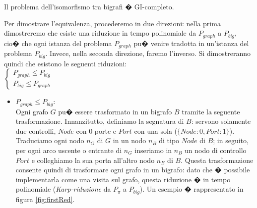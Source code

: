 \begin{teor}
Il problema dell'isomorfismo tra bigrafi � GI-completo.
\end{teor}

\begin{dimos}
Per dimostrare l'equivalenza, procederemo in due direzioni: nella prima dimostreremo che esiste una riduzione in tempo polinomiale da $P_{graph}$ a $P_{big}$, cio� che ogni istanza del problema $P_{graph}$ pu� venire tradotta in un'istanza del problema $P_{big}$. Invece, nella seconda direzione, faremo l'inverso. Si dimostreranno quindi che esistono le seguenti riduzioni:\\

$
\begin{cases}   
P_{graph} \le P_{big}\\
P_{big} \le P_{graph}
\end{cases}
$
\\


\begin{itemize}
	\item
	$P_{graph} \le P_{big}$:\\
	Ogni grafo $G$ pu� essere trasformato in un bigrafo $B$ tramite la seguente trasformazione. Innanzitutto, definiamo la segnatura di $B$: servono solamente due controlli, $Node$ con $0$ porte e $Port$ con una sola ($\{Node:0, Port:1\}$). Traduciamo ogni nodo $n_G$ di $G$ in un nodo $n_B$ di tipo $Node$ di $B$; in seguito, per ogni arco uscente o entrante di $n_G$ inseriamo in $n_B$ un nodo di controllo $Port$ e colleghiamo la sua porta all'altro nodo $n_B$ di $B$. Questa trasformazione consente quindi di trasformare ogni grafo in un bigrafo: dato che � possibile implementarla come una visita sul grafo, questa riduzione � in tempo polinomiale (\emph{Karp-riduzione} da  $P_{\pi}$ a $P_{big}$). Un esempio � rappresentato in figura \ref{fig:firstRed}.
	
\begin{figure}[!htbp]
\centering
{}
\end{figure}
\end{itemize}
\end{dimos}

